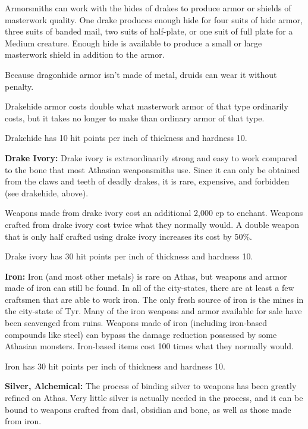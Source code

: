 Armorsmiths can work with the hides of drakes to produce armor or shields of masterwork quality. One drake produces enough hide for four suits of hide armor, three suits of banded mail, two suits of half-plate, or one suit of full plate for a Medium creature. Enough hide is available to produce a small or large masterwork shield in addition to the armor.

Because dragonhide armor isn't made of metal, druids can wear it without penalty.

Drakehide armor costs double what masterwork armor of that type ordinarily costs, but it takes no longer to make than ordinary armor of that type.

Drakehide has 10 hit points per inch of thickness and hardness 10.

\textbf{Drake Ivory:} Drake ivory is extraordinarily strong and easy to work compared to the bone that most Athasian weaponsmiths use. Since it can only be obtained from the claws and teeth of deadly drakes, it is rare, expensive, and forbidden (see drakehide, above).

Weapons made from drake ivory cost an additional 2,000 cp to enchant. Weapons crafted from drake ivory cost twice what they normally would. A double weapon that is only half crafted using drake ivory increases its cost by 50\%.

Drake ivory has 30 hit points per inch of thickness and hardness 10.


\textbf{Iron:} Iron (and most other metals) is rare on Athas, but weapons and armor made of iron can still be found. In all of the city-states, there are at least a few craftsmen that are able to work iron. The only fresh source of iron is the mines in the city-state of Tyr. Many of the iron weapons and armor available for sale have been scavenged from ruins. Weapons made of iron (including iron-based compounds like steel) can bypass the damage reduction possessed by some Athasian monsters. Iron-based items cost 100 times what they normally would.

Iron has 30 hit points per inch of thickness and hardness 10.

\textbf{Silver, Alchemical:} The process of binding silver to weapons has been greatly refined on Athas. Very little silver is actually needed in the process, and it can be bound to weapons crafted from dasl, obsidian and bone, as well as those made from iron.

